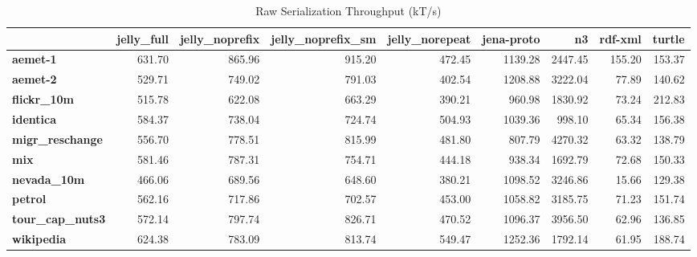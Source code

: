 \begin{table}[h!]
\small
\centering
\caption{Raw Serialization Throughput (kT/s)}
\begin{tabular}{lrrrrrrrr}
\toprule
{} &  jelly\_full &  jelly\_noprefix &  jelly\_noprefix\_sm &  jelly\_norepeat &  jena-proto &      n3 &  rdf-xml &  turtle \\
\midrule
\textbf{aemet-1       } &      631.70 &          865.96 &             915.20 &          472.45 &     1139.28 & 2447.45 &   155.20 &  153.37 \\
\textbf{aemet-2       } &      529.71 &          749.02 &             791.03 &          402.54 &     1208.88 & 3222.04 &    77.89 &  140.62 \\
\textbf{flickr\_10m    } &      515.78 &          622.08 &             663.29 &          390.21 &      960.98 & 1830.92 &    73.24 &  212.83 \\
\textbf{identica      } &      584.37 &          738.04 &             724.74 &          504.93 &     1039.36 &  998.10 &    65.34 &  156.38 \\
\textbf{migr\_reschange} &      556.70 &          778.51 &             815.99 &          481.80 &      807.79 & 4270.32 &    63.32 &  138.79 \\
\textbf{mix           } &      581.46 &          787.31 &             754.71 &          444.18 &      938.34 & 1692.79 &    72.68 &  150.33 \\
\textbf{nevada\_10m    } &      466.06 &          689.56 &             648.60 &          380.21 &     1098.52 & 3246.86 &    15.66 &  129.38 \\
\textbf{petrol        } &      562.16 &          717.86 &             702.57 &          453.00 &     1058.82 & 3185.75 &    71.23 &  151.74 \\
\textbf{tour\_cap\_nuts3} &      572.14 &          797.74 &             826.71 &          470.52 &     1096.37 & 3956.50 &    62.96 &  136.85 \\
\textbf{wikipedia     } &      624.38 &          783.09 &             813.74 &          549.47 &     1252.36 & 1792.14 &    61.95 &  188.74 \\
\bottomrule
\end{tabular}
\end{table}

